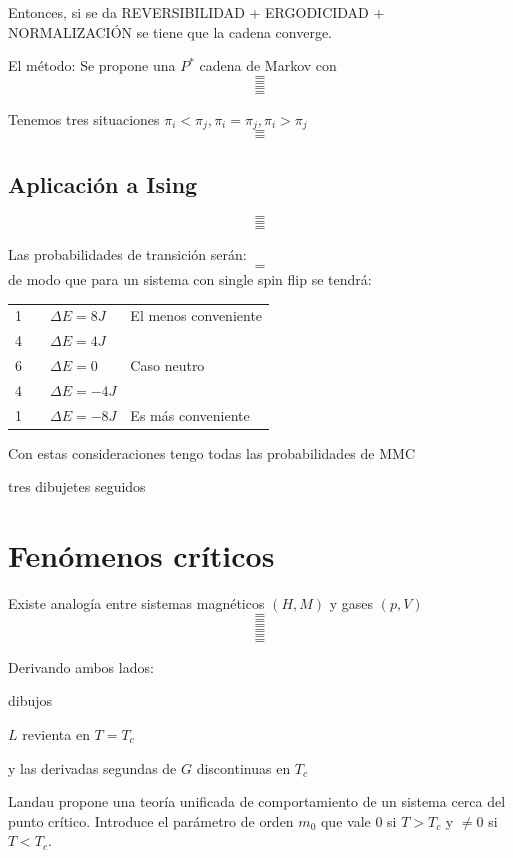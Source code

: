 \documentclass[10pt,oneside]{CBFT_book}
\begin{document}
Entonces, si se da 
REVERSIBILIDAD + ERGODICIDAD + NORMALIZACIÓN
se tiene que la cadena converge.

El método:
Se propone una $P^*$ cadena de Markov con 
\[=\]
\[=\]
\[=\]
\[=\]

Tenemos tres situaciones $ \pi_i < \pi_j , \pi_i = \pi_j, \pi_i > \pi_j$
\[=\]
\[=\]

\subsection{Aplicación a Ising}

\[=\]
\[=\]
\[=\]

Las probabilidades de transición serán:
\[=\]
de modo que para un sistema con single spin flip se tendrá:
\begin{center}
\begin{tabular}{llll}
1 &  & $ \Delta E = 8J $  & El menos conveniente \\
4 &  & $ \Delta E = 4J $ &  \\
6 &  & $ \Delta E = 0 $ & Caso neutro \\
4 &  & $ \Delta E = -4J $ &  \\
1 &  & $ \Delta E = -8J $ & Es más conveniente
\end{tabular}
\end{center}

Con estas consideraciones tengo todas las probabilidades de MMC

tres dibujetes seguidos

\section{Fenómenos críticos}

Existe analogía entre sistemas magnéticos $(H,M)$ y gases $(p,V)$
\[=\]
\[=\]
\[=\]
\[=\]
\[=\]
\[=\]

Derivando ambos lados:

dibujos

$L$ revienta en $T=T_c$

y las derivadas segundas de $G$ discontinuas en $T_c$

Landau propone una teoría unificada de comportamiento de un sistema cerca del punto crítico.
Introduce el parámetro de orden $m_0$ que vale 0 si $T>T_c$ y $\neq 0$ si $T<T_c$.
\end{document}

